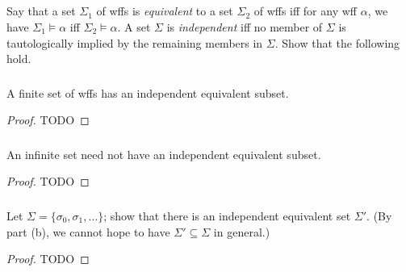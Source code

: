 \documentclass{report}
\begin{document}
\subsection{}%

  Say that a set $\Sigma_1$ of wffs is \textit{equivalent} to a set $\Sigma_2$
    of wffs iff for any wff $\alpha$, we have $\Sigma_1 \vDash \alpha$ iff
    $\Sigma_2 \vDash \alpha$.
  A set $\Sigma$ is \textit{independent} iff no member of $\Sigma$ is
    tautologically implied by the remaining members in $\Sigma$.
  Show that the following hold.

\subsubsection{}%

  A finite set of wffs has an independent equivalent subset.

  \begin{proof}
    TODO
  \end{proof}

\subsubsection{}%

  An infinite set need not have an independent equivalent subset.

  \begin{proof}
    TODO
  \end{proof}

\subsubsection{}%

  Let $\Sigma = \{\sigma_0, \sigma_1, \ldots\}$; show that there is an
    independent equivalent set $\Sigma'$.
  (By part (b), we cannot hope to have $\Sigma' \subseteq \Sigma$ in general.)

  \begin{proof}
    TODO
  \end{proof}

\subsection{}%
\end{document}
